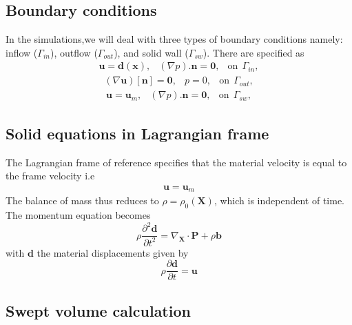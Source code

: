 \documentclass[10pt,a4paper,twoside]{article}
\begin{document}
\subsection{Boundary conditions}
In the simulations,we will deal with three types of boundary conditions namely: inflow ($\Gamma_{in}$), outflow ($\Gamma_{out}$), and solid wall ($\Gamma_{sw}$). There are specified as 
\begin{eqnarray}
	\boldsymbol{u} = \boldsymbol{d}(\boldsymbol{x}), & (\nabla p).\boldsymbol{n} = \boldsymbol{0}, & \text{on}~~ \Gamma_{in}, 
\end{eqnarray}
\begin{eqnarray}
(\nabla \boldsymbol{u})[\boldsymbol{n}] = \boldsymbol{0},  &  p = 0, & \text{on}~~ \Gamma_{out}, 
\end{eqnarray}
\begin{eqnarray}
\boldsymbol{u} = \boldsymbol{u}_m , & (\nabla p).\boldsymbol{n} = \boldsymbol{0}, & \text{on}~~ \Gamma_{sw}, 
\end{eqnarray}
\subsection{Solid equations in Lagrangian frame}
The Lagrangian frame of reference specifies that the material velocity is equal to the frame velocity i.e 
\begin{eqnarray}
\boldsymbol{u} = \boldsymbol{u}_m 
\end{eqnarray}
The balance of mass thus reduces to $\rho  = \rho_0(\boldsymbol{X})$, which is independent of time. The momentum equation becomes
\begin{equation}
\rho \frac{\partial^2 \boldsymbol{d}}{\partial t^2} = \nabla_{\boldsymbol{X}}\cdot \boldsymbol{P}+ \rho \boldsymbol{b}
\end{equation}
with $\boldsymbol{d}$ the material displacements given by
\begin{equation}
\rho \frac{\partial \boldsymbol{d}}{\partial t} =  \boldsymbol{u}
\end{equation}
\subsection{Swept volume calculation}
\end{document}
